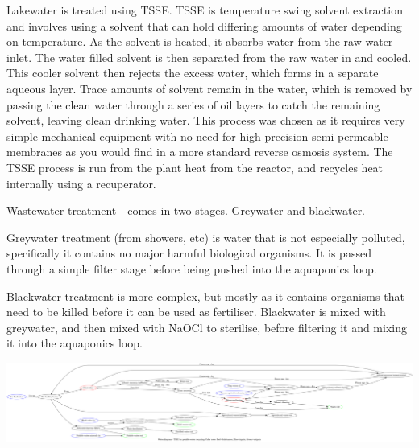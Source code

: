 \documentclass[10pt]{article}
\begin{document}
Lakewater is treated using TSSE. TSSE is temperature swing solvent extraction and involves using a solvent that can hold differing amounts of water depending on temperature. As the solvent is heated, it absorbs water from the raw water inlet. The water filled solvent is then separated from the raw water in and cooled. This cooler solvent then rejects the excess water, which forms in a separate aqueous layer. Trace amounts of solvent remain in the water, which is removed by passing the clean water through a series of oil layers to catch the remaining solvent, leaving clean drinking water. This process was chosen as it requires very simple mechanical equipment with no need for high precision semi permeable membranes as you would find in a more standard reverse osmosis system. The TSSE process is run from the plant heat from the reactor, and recycles heat internally using a recuperator.

Wastewater treatment - comes in two stages. Greywater and blackwater.

Greywater treatment (from showers, etc) is water that is not especially polluted, specifically it contains no major harmful biological organisms. It is passed through a simple filter stage before being pushed into the aquaponics loop.

Blackwater treatment is more complex, but mostly as it contains organisms that need to be killed before it can be used as fertiliser. Blackwater is mixed with greywater, and then mixed with NaOCl to sterilise, before filtering it and mixing it into the aquaponics loop.

\includegraphics[width=1\textwidth]{fig_water.png}
\end{document}
